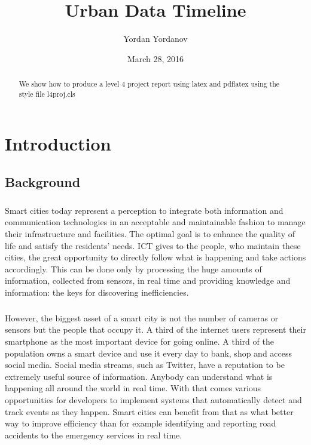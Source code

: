 \documentclass{l4proj}
\begin{document}
\title{Urban Data Timeline}
\author{Yordan Yordanov}
\date{March 28, 2016}
\maketitle

\begin{abstract}
We show how to produce a level 4 project report using latex and pdflatex using the 
style file l4proj.cls
\end{abstract}

\educationalconsent
%
%
\tableofcontents

\chapter{Introduction}

\section{Background}
\paragraph{}
Smart cities today represent a perception to integrate both information and communication technologies in an acceptable and maintainable fashion to manage their infrastructure and facilities. The optimal goal is to enhance the quality of life and satisfy the residents’ needs. ICT gives to the people, who maintain these cities, the great opportunity to directly follow what is happening and take actions accordingly. This can be done only by processing the huge amounts of information, collected from sensors, in real time and providing knowledge and information: the keys for discovering inefficiencies. 
\paragraph{}
However, the biggest asset of a smart city is not the number of cameras or sensors but the people that occupy it. A third of the internet users\cite{ofcomreport1} represent their smartphone as the most important device for going online. A third of the population owns a smart device and use it every day to bank, shop and access social media. Social media streams, such as Twitter, have a reputation to be extremely useful source of information. Anybody can understand what is happening all around the world in real time. With that comes various opportunities for developers to implement systems that automatically detect and track events as they happen. Smart cities can benefit from that as what better way to improve efficiency than for example identifying and reporting road accidents to the emergency services in real time.
\end{document}
